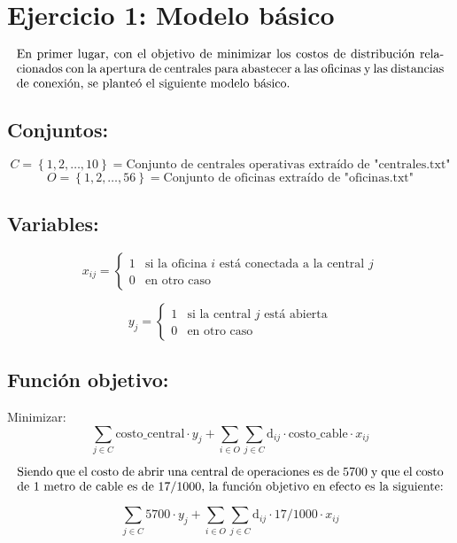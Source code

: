 \documentclass{article}
\begin{document}
\section*{Ejercicio 1: Modelo básico}

\[
\parbox{\textwidth}{En primer lugar, con el objetivo de minimizar los costos de distribución relacionados con la apertura de centrales para abastecer a las oficinas y las distancias de conexión, se planteó el siguiente modelo básico.}
\]

\subsection*{Conjuntos:}
\[
C = \left\{ 1, 2, \ldots, 10 \right\} = \text{Conjunto de centrales operativas extraído de "centrales.txt"}
\]
\[
O =\left\{ 1, 2, \ldots, 56 \right\} = \text{Conjunto de oficinas extraído de "oficinas.txt"}
\]

\vspace{0.5cm}


\subsection*{Variables:}
\[
x_{ij} = 
\begin{cases} 
1 & \text{si la oficina } i \text{ está conectada a la central } j \\
0 & \text{en otro caso}
\end{cases}
\]

\vspace{0.5cm}

\[
y_j = 
\begin{cases} 
1 & \text{si la central } j \text{ está abierta} \\
0 & \text{en otro caso}
\end{cases}
\]

\subsection*{Función objetivo:}

Minimizar:
\[
 \sum_{j \in C} \text{costo\_central} \cdot y_j + \sum_{i \in O}\sum_{j \in C} \text{d}_{ij} \cdot \text{costo\_cable} \cdot x_{ij}
\]

\[
\parbox{\textwidth}{Siendo que el costo de abrir una central de operaciones es de 5700 y que el costo de 1 metro de cable es de 17/1000, la función objetivo en efecto es la siguiente:}
\]

\[
 \sum_{j \in C} \text{5700} \cdot y_j + \sum_{i \in O}\sum_{j \in C} \text{d}_{ij} \cdot \text{17/1000} \cdot x_{ij}
\]
\end{document}
